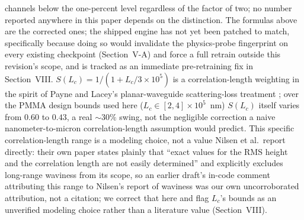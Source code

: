 \documentclass[10pt,twocolumn]{article}
\begin{document}
channels below the one-percent level regardless of the factor of two; no
number reported anywhere in this paper depends on the distinction. The
formulas above are the corrected ones; the shipped engine has not yet been
patched to match, specifically because doing so would invalidate the
physics-probe fingerprint on every existing checkpoint (Section~V-A) and
force a full retrain outside this revision's scope, and is tracked as an
immediate pre-retraining fix in Section~VIII. $S(L_c) = 1/(1+L_c/3\times10^5)$
is a correlation-length weighting in the spirit of Payne and Lacey's
planar-waveguide scattering-loss treatment \cite{payne1994}; over the PMMA
design bounds used here ($L_c\in[2,4]\times10^5$~nm) $S(L_c)$ itself varies
from $0.60$ to $0.43$, a real $\sim30\%$ swing, not the negligible
correction a naive nanometer-to-micron correlation-length assumption would
predict. This specific correlation-length range is a modeling choice, not a
value Nilsen et al.\ report directly: their own paper states plainly that
``exact values for the RMS height and the correlation length are not
easily determined'' and explicitly excludes long-range waviness from its
scope, so an earlier draft's in-code comment attributing this range to
Nilsen's report of waviness was our own uncorroborated attribution, not a
citation; we correct that here and flag $L_c$'s bounds as an unverified
modeling choice rather than a literature value (Section~VIII).
\end{document}
